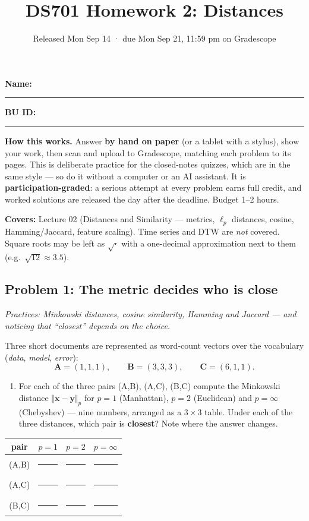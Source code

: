 \documentclass[
  11pt,
]{article}
\title{DS701 Homework 2: Distances}
\subtitle{Released Mon Sep 14 · due Mon Sep 21, 11:59 pm on Gradescope}
\author{}
\date{}
\newcounter{none} %
\providecommand{\tightlist}{%
  \setlength{\itemsep}{0pt}\setlength{\parskip}{0pt}}
\newcommand{\blank}[1][1.2in]{\rule{#1}{0.4pt}}
\begin{document}
\maketitle


\noindent\textbf{Name:}\ \rule{2.0in}{0.4pt}\qquad\textbf{BU ID:}\ \rule{1.2in}{0.4pt}
\vspace{6pt}

\textbf{How this works.} Answer \textbf{by hand on paper} (or a tablet
with a stylus), show your work, then scan and upload to Gradescope,
matching each problem to its pages. This is deliberate practice for the
closed-notes quizzes, which are in the same style --- so do it without a
computer or an AI assistant. It is \textbf{participation-graded}: a
serious attempt at every problem earns full credit, and worked solutions
are released the day after the deadline. Budget 1--2 hours.

\textbf{Covers:} Lecture 02 (Distances and Similarity --- metrics,
\(\ell_p\) distances, cosine, Hamming/Jaccard, feature scaling). Time
series and DTW are \emph{not} covered. Square roots may be left as
\(\sqrt{\cdot}\) with a one-decimal approximation next to them
(e.g.~\(\sqrt{12}\approx 3.5\)).

\subsection{Problem 1: The metric decides who is
close}\label{problem-1-the-metric-decides-who-is-close}

\emph{Practices: Minkowski distances, cosine similarity, Hamming and
Jaccard --- and noticing that ``closest'' depends on the choice.}

Three short documents are represented as word-count vectors over the
vocabulary (\emph{data}, \emph{model}, \emph{error}):
\[\mathbf{A} = (1, 1, 1),\qquad \mathbf{B} = (3, 3, 3),\qquad \mathbf{C} = (6, 1, 1).\]

\begin{enumerate}
\def\labelenumi{(\alph{enumi})}
\tightlist
\item
  For each of the three pairs (A,B), (A,C), (B,C) compute the Minkowski
  distance \(\Vert\mathbf{x}-\mathbf{y}\Vert_p\) for \(p = 1\)
  (Manhattan), \(p = 2\) (Euclidean) and \(p = \infty\) (Chebyshev) ---
  nine numbers, arranged as a \(3\times3\) table. Under each of the
  three distances, which pair is \textbf{closest}? Note where the answer
  changes.
\end{enumerate}

{\def\LTcaptype{none} %
\begin{longtable}[]{@{}cccc@{}}
\toprule\noalign{}
pair & \(p=1\) & \(p=2\) & \(p=\infty\) \\
\midrule\noalign{}
\endhead
\bottomrule\noalign{}
\endlastfoot
(A,B) & \blank[0.8in] & \blank[0.8in] & \blank[0.8in] \\
(A,C) & \blank[0.8in] & \blank[0.8in] & \blank[0.8in] \\
(B,C) & \blank[0.8in] & \blank[0.8in] & \blank[0.8in] \\
\end{longtable}
}
\end{document}
